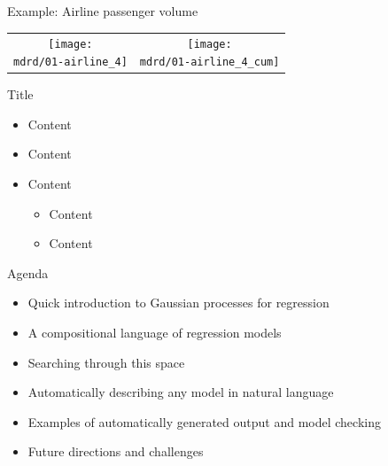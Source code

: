 \begin{frame}{Example: Airline passenger volume}
\newcommand{\wmgd}{0.5\columnwidth}
\newcommand{\hmgd}{3.0cm}
\newcommand{\mdrd}{../figures/01-airline}
\newcommand{\mbm}{\hspace{-0.3cm}}
{\footnotesize

}

\vspace{\baselineskip}

\begin{tabular}{cc}
\mbm \texttt{[image: \\mdrd/01-airline\_4]} & \texttt{[image: \\mdrd/01-airline\_4\_cum]}
\end{tabular}
\end{frame}
  


\begin{frame}{Title}
  \begin{itemize}
    \item Content
    \vspace{\baselineskip}
    \item Content
    \vspace{\baselineskip}
    \item Content
    \begin{itemize}
       \item Content
       \item Content
     \end{itemize}
  \end{itemize}
\end{frame}

\begin{frame}{Agenda}
  \begin{itemize}
    \item Quick introduction to Gaussian processes for regression
    \vspace{\baselineskip}
    \item A compositional language of regression models
    \vspace{\baselineskip}
    \item Searching through this space
    \vspace{\baselineskip}
    \item Automatically describing any model in natural language
    \vspace{\baselineskip}
    \item Examples of automatically generated output and model checking
    \vspace{\baselineskip}
    \item Future directions and challenges
  \end{itemize}
\end{frame}